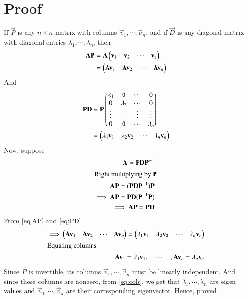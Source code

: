\documentclass[journal,12pt,twocolumn]{IEEEtran}
\begin{document}
\section{Proof}
If $\vec{P}$ is	any $n\times n$ matrix	with	columns $\vec{v}_1,\cdots,\vec{v}_n$, and if $\vec{D}$ is any diagonal matrix with diagonal entries $\lambda_1,\cdots, \lambda_n$, then
\begin{align}
    \vec{A}\vec{P} & = \vec{A}\myvec{\vec{v}_1 & \vec{v }_2 & \cdots & \vec{v}_n} \\ & = \myvec{\vec{A}\vec{v}_1 & \vec{A}\vec{v }_2 & \cdots & \vec{A}\vec{v}_n}\label{eq:AP}
\end{align}
And
\begin{align}
    \vec{P}\vec{D} & = \vec{P}\myvec{\lambda_1 & 0 & \cdots & 0 \\ 0 & \lambda_2 & \cdots & 0 \\
    \vdots & \vdots & \vdots & \vdots \\
    0 & 0 & \cdots & \lambda_n}\\ & = \myvec{\lambda_1\vec{v}_1 & \lambda_2\vec{v}_2 & \cdots & \lambda_n\vec{v}_n}\label{eq:PD}
\end{align}
Now, suppose
\begin{align}
    \vec{A} = \vec{P}\vec{D}\vec{P}^{-1}\\
    \intertext{Right multiplying by $\vec{P}$}
    \vec{A}\vec{P}= (\vec{P}\vec{D}\vec{P}^{-1})\vec{P}\\
    \implies\vec{A}\vec{P}= \vec{P}\vec{D}(\vec{P}^{-1}\vec{P})\\
    \implies \vec{A}\vec{P}= \vec{P}\vec{D}
\end{align}
From \eqref{eq:AP} and \eqref{eq:PD}
\begin{align}
    \implies\myvec{\vec{A}\vec{v}_1 & \vec{A}\vec{v}_2 & \cdots & \vec{A}\vec{v}_n} = \myvec{\lambda_1\vec{v}_1 & \lambda_2\vec{v}_2 & \cdots & \lambda_n\vec{v}_n}\\
    \intertext{Equating columns}
    \vec{A}\vec{v}_1 = \lambda_1\vec{v}_1,\quad \cdots \quad,\vec{A}\vec{v}_n = \lambda_n\vec{v}_n \label{eq:cols}
\end{align}
Since $\vec{P}$ is invertible, its columns $\vec{v}_1,\cdots,\vec{v}_n$ must be linearly independent. And since these columns are nonzero, from \eqref{eq:cols}, we get that $\lambda_1,\cdots, \lambda_n$ are eigen values and $\vec{v}_1,\cdots,\vec{v}_n$ are their corresponding eigenvector. Hence, proved.
\end{document}
